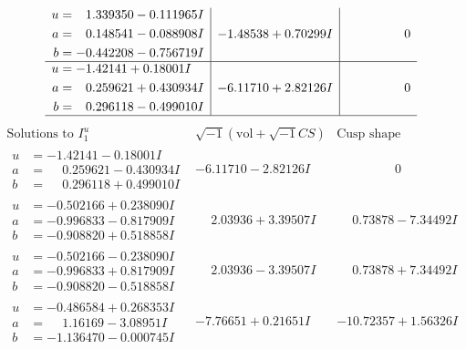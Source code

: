 \documentclass[1p]{elsarticle_modified}
\theoremstyle{definition}
\newcommand{\I}{\sqrt{-1}}
\begin{document}
$$\begin{array}{c|c|c}
\begin{aligned}
u &= \phantom{-}1.339350 - 0.111965 I \\
a &= \phantom{-}0.148541 - 0.088908 I \\
b &= -0.442208 - 0.756719 I\end{aligned}
 & -1.48538 + 0.70299 I & \phantom{-0.000000 } 0 \\ \hline\begin{aligned}
u &= -1.42141 + 0.18001 I \\
a &= \phantom{-}0.259621 + 0.430934 I \\
b &= \phantom{-}0.296118 - 0.499010 I\end{aligned}
 & -6.11710 + 2.82126 I & \phantom{-0.000000 } 0\\
 \hline 
 \end{array}$$\newpage$$\begin{array}{c|c|c}  
\text{Solutions to }I^u_{1}& \I (\text{vol} + \sqrt{-1}CS) & \text{Cusp shape}\\
 \hline 
\begin{aligned}
u &= -1.42141 - 0.18001 I \\
a &= \phantom{-}0.259621 - 0.430934 I \\
b &= \phantom{-}0.296118 + 0.499010 I\end{aligned}
 & -6.11710 - 2.82126 I & \phantom{-0.000000 } 0 \\ \hline\begin{aligned}
u &= -0.502166 + 0.238090 I \\
a &= -0.996833 - 0.817909 I \\
b &= -0.908820 + 0.518858 I\end{aligned}
 & \phantom{-}2.03936 + 3.39507 I & \phantom{-}0.73878 - 7.34492 I \\ \hline\begin{aligned}
u &= -0.502166 - 0.238090 I \\
a &= -0.996833 + 0.817909 I \\
b &= -0.908820 - 0.518858 I\end{aligned}
 & \phantom{-}2.03936 - 3.39507 I & \phantom{-}0.73878 + 7.34492 I \\ \hline\begin{aligned}
u &= -0.486584 + 0.268353 I \\
a &= \phantom{-}1.16169 - 3.08951 I \\
b &= -1.136470 - 0.000745 I\end{aligned}
 & -7.76651 + 0.21651 I & -10.72357 + 1.56326 I \\ \hline\begin{aligned}

\end{aligned}
\end{array}$$
\end{document}
